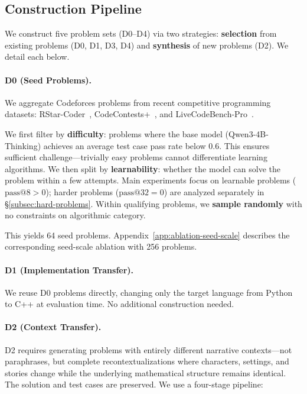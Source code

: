 \documentclass[]{bytedance_seed}
\theoremstyle{plain}
\theoremstyle{definition}
\theoremstyle{remark}
\begin{document}
\subsection{Construction Pipeline}
\label{app:construction-pipeline}

We construct five problem sets (D0--D4) via two strategies: \textbf{selection} from existing problems (D0, D1, D3, D4) and \textbf{synthesis} of new problems (D2). We detail each below.

\paragraph{D0 (Seed Problems).}
We aggregate Codeforces problems from recent competitive programming datasets: RStar-Coder~\citep{liu2025rstarcoder}, CodeContests+~\citep{wang2025codecontestsplus}, and LiveCodeBench-Pro~\citep{zheng2025livecodebench}.

We first filter by \textbf{difficulty}: problems where the base model (Qwen3-4B-Thinking) achieves an average test case pass rate below 0.6. This ensures sufficient challenge---trivially easy problems cannot differentiate learning algorithms. We then split by \textbf{learnability}: whether the model can solve the problem within a few attempts. Main experiments focus on learnable problems ($\text{pass@8} > 0$); harder problems ($\text{pass@32} = 0$) are analyzed separately in \S\ref{subsec:hard-problems}. Within qualifying problems, we \textbf{sample randomly} with no constraints on algorithmic category.

This yields 64 seed problems. Appendix~\ref{app:ablation-seed-scale} describes the corresponding seed-scale ablation with 256 problems.

\paragraph{D1 (Implementation Transfer).}
We reuse D0 problems directly, changing only the target language from Python to C++ at evaluation time. No additional construction needed.

\paragraph{D2 (Context Transfer).}
D2 requires generating problems with entirely different narrative contexts---not paraphrases, but complete recontextualizations where characters, settings, and stories change while the underlying mathematical structure remains identical. The solution and test cases are preserved. We use a four-stage pipeline:
\end{document}
